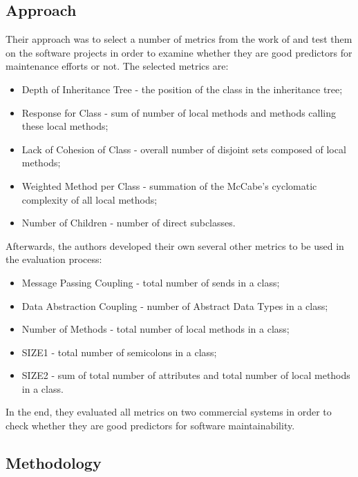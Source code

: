 \documentclass[a4paper,12pt]{article}
\begin{document}
\subsection{Approach}

Their approach was to select a number of metrics from the work of 
\citet{chidamber1994metrics} and test them on the software projects in 
order to examine whether they are good predictors for maintenance efforts 
or not. The selected metrics are:

 \begin{itemize}
  \item Depth of Inheritance Tree - the position of the class in the inheritance tree;
  \item Response for Class - sum of number of local methods and methods calling these
    local methods;
  \item Lack of Cohesion of Class - overall number of disjoint sets composed of 
    local methods;
  \item Weighted Method per Class - summation of the McCabe's cyclomatic complexity
    of all local methods;
  \item Number of Children - number of direct subclasses.
 \end{itemize}

Afterwards, the authors developed their own several other metrics to be used in the 
evaluation process:

 \begin{itemize}
  \item Message Passing Coupling - total number of sends in a class;
  \item Data Abstraction Coupling - number of Abstract Data Types in a class;
  \item Number of Methods - total number of local methods in a class;
  \item SIZE1 - total number of semicolons in a class;
  \item SIZE2 - sum of total number of attributes and total number of local methods 
    in a class.
 \end{itemize}

In the end, they evaluated all metrics on two commercial systems in order to check
whether they are good predictors for software maintainability.

\subsection{Methodology}
\end{document}
